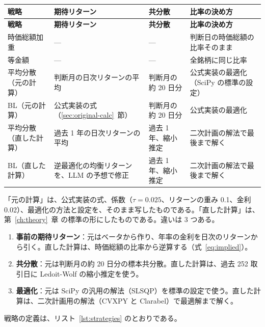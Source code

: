 \documentclass[xelatex,ja=standard,jafont=hiragino-pron,a4paper,10pt]{bxjsreport}
\newcommand{\chapref}[1]{第~\ref{#1}~章}
\newcommand{\secref}[1]{\ref{#1}~節}
\begin{document}
\begin{longtable}{p{3.60cm}p{3.60cm}p{3.20cm}p{4.00cm}}
\toprule
\textbf{戦略} & \textbf{期待リターン} & \textbf{共分散} & \textbf{比率の決め方} \\
\midrule
\endfirsthead
\toprule
\textbf{戦略} & \textbf{期待リターン} & \textbf{共分散} & \textbf{比率の決め方} \\
\midrule
\endhead
\bottomrule
\endfoot
時価総額加重 & --- & --- & 判断日の時価総額の比率そのまま \\
等金額 & --- & --- & 全銘柄に同じ比率 \\
平均分散（元の計算） & 判断月の日次リターンの平均 & 判断月の約 20 日分 & 公式実装の最適化（SciPy の標準の設定） \\
BL（元の計算） & 公式実装の式（\secref{sec:original-calc}） & 判断月の約 20 日分 & 公式実装の最適化 \\
平均分散（直した計算） & 過去 1 年の日次リターンの平均 & 過去 1 年、縮小推定 & 二次計画の解法で最後まで解く \\
BL（直した計算） & 逆最適化の均衡リターンを、LLM の予想で修正 & 過去 1 年、縮小推定 & 二次計画の解法で最後まで解く \\
\end{longtable}

「元の計算」は、公式実装の式、係数（$\tau = 0.025$、リターンの重み 0.1、金利 0.02）、最適化の方法と設定を、そのまま写したものである。「直した計算」は、\chapref{ch:theory} の標準の形にしたものである。違いは 3 つある。

\begin{enumerate}
\item \textbf{事前の期待リターン}：元はベータから作り、年率の金利を日次のリターンから引く。直した計算は、時価総額の比率から逆算する（式~\eqref{eq:implied}）。
\item \textbf{共分散}：元は判断月の約 20 日分の標本共分散。直した計算は、過去 252 取引日に Ledoit-Wolf の縮小推定を使う。
\item \textbf{最適化}：元は SciPy の汎用の解法（SLSQP）を標準の設定で使う。直した計算は、二次計画用の解法（CVXPY と Clarabel）で最適解まで解く。
\end{enumerate}

戦略の定義は、リスト~\ref{lst:strategies} のとおりである。
\end{document}
